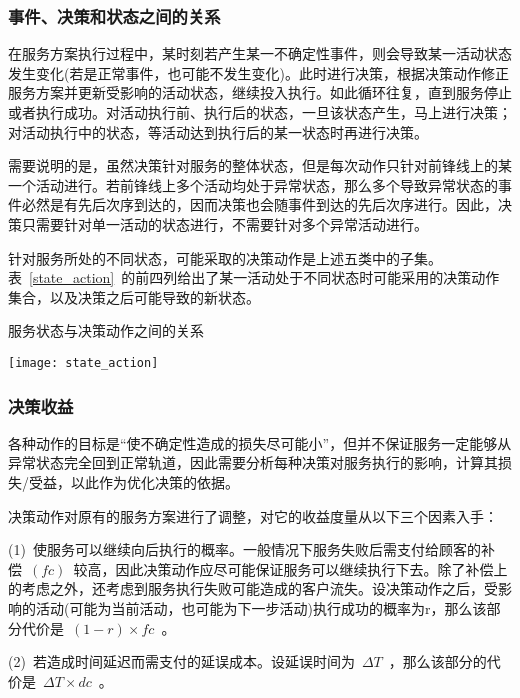 \subsubsection{事件、决策和状态之间的关系}

在服务方案执行过程中，某时刻若产生某一不确定性事件，则会导致某一活动状态发生变化(若是正常事件，也可能不发生变化)。此时进行决策，根据决策动作修正服务方案并更新受影响的活动状态，继续投入执行。如此循环往复，直到服务停止或者执行成功。对活动执行前、执行后的状态，一旦该状态产生，马上进行决策；对活动执行中的状态，等活动达到执行后的某一状态时再进行决策。

需要说明的是，虽然决策针对服务的整体状态，但是每次动作只针对前锋线上的某一个活动进行。若前锋线上多个活动均处于异常状态，那么多个导致异常状态的事件必然是有先后次序到达的，因而决策也会随事件到达的先后次序进行。因此，决策只需要针对单一活动的状态进行，不需要针对多个异常活动进行。

针对服务所处的不同状态，可能采取的决策动作是上述五类中的子集。表~\ref{state_action}~的前四列给出了某一活动处于不同状态时可能采用的决策动作集合，以及决策之后可能导致的新状态。

\begin{table}[htbp]
    \caption{服务状态与决策动作之间的关系}
    \vspace{-0.5em}\label{state_action}\centering{}
    \texttt{[image: state\_action]}
\end{table}

\subsubsection{决策收益}
各种动作的目标是“使不确定性造成的损失尽可能小”，但并不保证服务一定能够从异常状态完全回到正常轨道，因此需要分析每种决策对服务执行的影响，计算其损失/受益，以此作为优化决策的依据。

决策动作对原有的服务方案进行了调整，对它的收益度量从以下三个因素入手：

(1)~使服务可以继续向后执行的概率。一般情况下服务失败后需支付给顾客的补偿~$(fc)$~较高，因此决策动作应尽可能保证服务可以继续执行下去。除了补偿上的考虑之外，还考虑到服务执行失败可能造成的客户流失。设决策动作之后，受影响的活动(可能为当前活动，也可能为下一步活动)执行成功的概率为r，那么该部分代价是~$(1-r) \times fc$~。

(2)~若造成时间延迟而需支付的延误成本。设延误时间为~$\Delta T$~，那么该部分的代价是~$\Delta T \times dc$~。

